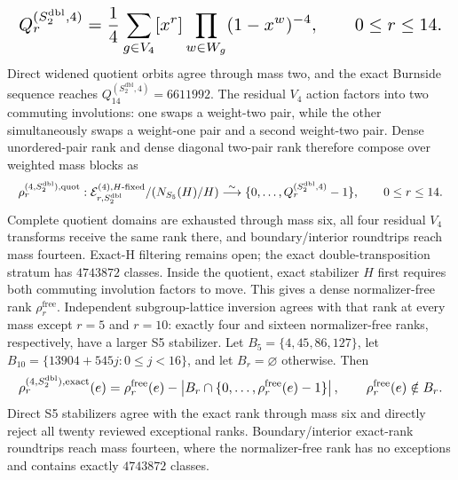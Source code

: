 \documentclass{article}
\newcommand{\fitmath}[1]{\resizebox{0.99\linewidth}{!}{$\displaystyle #1$}}
\begin{document}
\begin{equation}
  \fitmath{%
    Q_r^{(S_2^\mathrm{dbl},4)}=
      \frac14\sum_{g\in V_4}[x^r]
      \prod_{w\in W_g}(1-x^w)^{-4},
    \qquad 0\leq r\leq14.
  }
  \label{eq:optimization-crazy-sextuple-s6-s5-double-transposition-quotient}
\end{equation}
Direct widened quotient orbits agree through mass two, and the exact Burnside
sequence reaches $Q_{14}^{(S_2^\mathrm{dbl},4)}=6611992$.
The residual $V_4$ action factors into two commuting involutions: one swaps a
weight-two pair, while the other simultaneously swaps a weight-one pair and a
second weight-two pair. Dense unordered-pair rank and dense diagonal two-pair
rank therefore compose over weighted mass blocks as
\begin{equation}
  \fitmath{%
    \rho^{(4,S_2^\mathrm{dbl}),\mathrm{quot}}_r:
      \mathcal E_{r,S_2^\mathrm{dbl}}^{(4),H\text{-fixed}}
        /(N_{S_5}(H)/H)
      \overset{\sim}{\longrightarrow}
      \{0,\ldots,Q_r^{(S_2^\mathrm{dbl},4)}-1\},
    \qquad 0\leq r\leq14.
  }
  \label{eq:optimization-crazy-sextuple-s6-s5-double-transposition-ranking}
\end{equation}
Complete quotient domains are exhausted through mass six, all four residual
$V_4$ transforms receive the same rank there, and boundary/interior roundtrips
reach mass fourteen. Exact-H filtering remains open; the exact
double-transposition stratum has $4743872$ classes.
Inside the quotient, exact stabilizer $H$ first requires both commuting
involution factors to move. This gives a dense normalizer-free rank
$\rho^{\mathrm{free}}_r$. Independent subgroup-lattice inversion agrees with
that rank at every mass except $r=5$ and $r=10$: exactly four and sixteen
normalizer-free ranks, respectively, have a larger S5 stabilizer. Let
$B_5=\{4,45,86,127\}$, let
$B_{10}=\{13904+545j:0\leq j<16\}$, and let $B_r=\varnothing$ otherwise. Then
\begin{equation}
  \fitmath{%
    \rho^{(4,S_2^\mathrm{dbl}),\mathrm{exact}}_r(e)=
      \rho^{\mathrm{free}}_r(e)-
      \left|B_r\cap\{0,\ldots,\rho^{\mathrm{free}}_r(e)-1\}\right|,
    \qquad \rho^{\mathrm{free}}_r(e)\notin B_r.
  }
  \label{eq:optimization-crazy-sextuple-s6-s5-double-transposition-exact}
\end{equation}
Direct S5 stabilizers agree with the exact rank through mass six and directly
reject all twenty reviewed exceptional ranks. Boundary/interior exact-rank
roundtrips reach mass fourteen, where the normalizer-free rank has no exceptions
and contains exactly $4743872$ classes.
\end{document}
